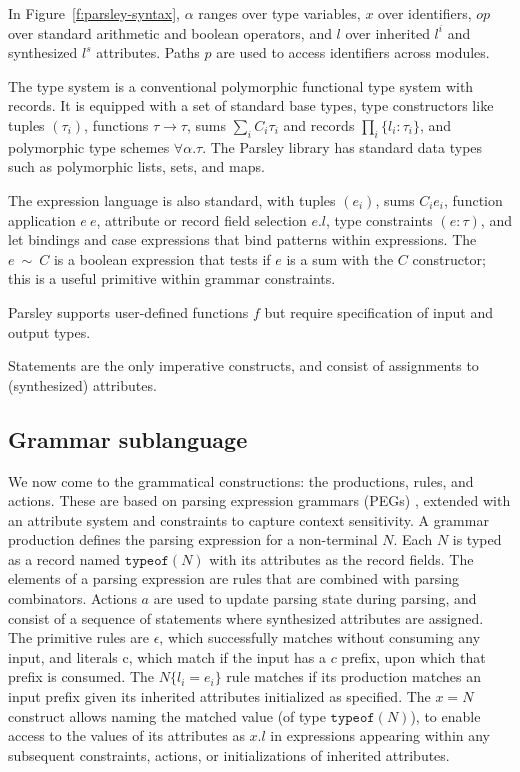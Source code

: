 \documentclass[letterpaper]{article}
\begin{document}
In Figure~\ref{f:parsley-syntax}, $\alpha$ ranges over type variables,
$x$ over identifiers, $op$ over standard arithmetic and boolean
operators, and $l$ over inherited $l^i$ and synthesized $l^s$
attributes.  Paths $p$ are used to access identifiers across modules.

The type system is a conventional polymorphic functional type system
with records.  It is equipped with a set of standard base types, type
constructors like tuples $(\tau_i)$, functions $\tau\rightarrow\tau$,
sums $\sum_iC_i\tau_i$ and records $\prod_i\{l_i:\tau_i\}$, and
polymorphic type schemes $\forall\alpha.\tau$.  The Parsley library
has standard data types such as polymorphic lists, sets, and maps.

The expression language is also standard, with tuples $(e_i)$, sums
$C_i e_i$, function application $e\ e$, attribute or record field
selection $e.l$, type constraints $(e:\tau)$, and let bindings and
case expressions that bind patterns within expressions.  The
$e\ \sim\ C$ is a boolean expression that tests if $e$ is a sum with
the $C$ constructor; this is a useful primitive within grammar
constraints.

Parsley supports user-defined functions $f$ but require specification
of input and output types.

Statements are the only imperative constructs, and consist of
assignments to (synthesized) attributes.

\subsection*{Grammar sublanguage}

We now come to the grammatical constructions: the productions, rules,
and actions.  These are based on parsing expression grammars (PEGs)
\cite{ford2004popl}, extended with an attribute system and constraints
to capture context sensitivity.  A grammar production defines the
parsing expression for a non-terminal $N$.  Each $N$ is typed as a
record named $\texttt{typeof}(N)$ with its attributes as the record
fields.  The elements of a parsing expression are rules that are
combined with parsing combinators.  Actions $a$ are used to update
parsing state during parsing, and consist of a sequence of statements
where synthesized attributes are assigned.  The primitive rules are
$\epsilon$, which successfully matches without consuming any input,
and literals $\textrm{c}$, which match if the input has a $c$ prefix,
upon which that prefix is consumed.  The $N\{l_i=e_i\}$ rule matches
if its production matches an input prefix given its inherited
attributes initialized as specified.  The $x=N$ construct allows
naming the matched value (of type $\texttt{typeof}(N)$), to enable
access to the values of its attributes as $x.l$ in expressions
appearing within any subsequent constraints, actions, or
initializations of inherited attributes.
\end{document}
